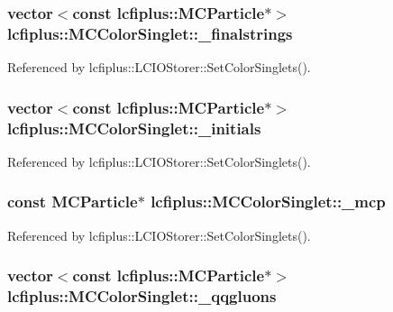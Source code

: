 \subsubsection[{\-\_\-finalstrings}]{\setlength{\rightskip}{0pt plus 5cm}vector$<$const {\bf lcfiplus\-::\-M\-C\-Particle}$\ast$$>$ lcfiplus\-::\-M\-C\-Color\-Singlet\-::\-\_\-finalstrings}\label{classlcfiplus_1_1MCColorSinglet_af1c48b3e54ab5ad06c9f3ada54ec6740}


Referenced by lcfiplus\-::\-L\-C\-I\-O\-Storer\-::\-Set\-Color\-Singlets().

\subsubsection[{\-\_\-initials}]{\setlength{\rightskip}{0pt plus 5cm}vector$<$const {\bf lcfiplus\-::\-M\-C\-Particle}$\ast$$>$ lcfiplus\-::\-M\-C\-Color\-Singlet\-::\-\_\-initials}\label{classlcfiplus_1_1MCColorSinglet_af1d1b1bffab569127a4011e60f30aff5}


Referenced by lcfiplus\-::\-L\-C\-I\-O\-Storer\-::\-Set\-Color\-Singlets().

\subsubsection[{\-\_\-mcp}]{\setlength{\rightskip}{0pt plus 5cm}const {\bf M\-C\-Particle}$\ast$ lcfiplus\-::\-M\-C\-Color\-Singlet\-::\-\_\-mcp}\label{classlcfiplus_1_1MCColorSinglet_ab99f2cbcc5880430845ff3f343aa35da}


Referenced by lcfiplus\-::\-L\-C\-I\-O\-Storer\-::\-Set\-Color\-Singlets().

\subsubsection[{\-\_\-qqgluons}]{\setlength{\rightskip}{0pt plus 5cm}vector$<$const {\bf lcfiplus\-::\-M\-C\-Particle}$\ast$$>$ lcfiplus\-::\-M\-C\-Color\-Singlet\-::\-\_\-qqgluons}\label{classlcfiplus_1_1MCColorSinglet_a6a383590ece3c22af7ce6b1ce4345bf7}


